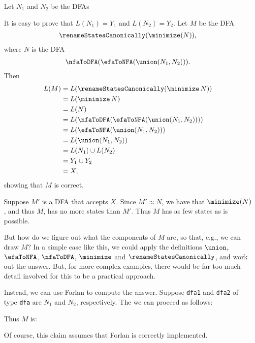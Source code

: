 Let $N_1$ and $N_2$ be the DFAs
\begin{center}

\end{center}
It is easy to prove that $L(N_1)=Y_1$ and $L(N_2)=Y_2$.  Let $M$
be the DFA
\begin{gather*}
\renameStatesCanonically(\minimize(N)) ,
\end{gather*}
where $N$ is the DFA
\begin{gather*}
\nfaToDFA(\efaToNFA(\union(N_1,N_2))) .
\end{gather*}
%
%
%
%
%
%
%
%
%
%
%
%
Then
\begin{align*}
L(M) &= L(\renameStatesCanonically(\minimize\,N)) \\
&= L(\minimize\,N) \\
&= L(N) \\
&= L(\nfaToDFA(\efaToNFA(\union(N_1,N_2)))) \\
&= L(\efaToNFA(\union(N_1,N_2))) \\
&= L(\union(N_1,N_2)) \\
&= L(N_1)\cup L(N_2) \\
&= Y_1\cup Y_2 \\
&= X ,
\end{align*}
showing that $M$ is correct.

Suppose $M'$ is a DFA that accepts $X$.  Since
$M'\approx N$, we have that
$\minimize(N)$, and thus $M$, has no more states than
$M'$.  Thus $M$ has as few states as is possible.

But how do we figure out what the components of $M$ are, so that,
e.g., we can draw $M$?  In a simple case like this, we could apply the
definitions $\union$, $\efaToNFA$, $\nfaToDFA$,
$\minimize$ and $\renameStatesCanonically$,
and work out the answer.  But, for more complex examples, there would
be far too much detail involved for this to be a practical approach.

Instead, we can use Forlan to compute the answer.  Suppose
\texttt{dfa1} and \texttt{dfa2} of type \texttt{dfa} are
$N_1$ and $N_2$, respectively.  The we can proceed as follows:

%
%
%
%
%
%
%
Thus $M$ is:
\begin{center}

\end{center}
Of course, this claim assumes that Forlan is correctly
implemented.

